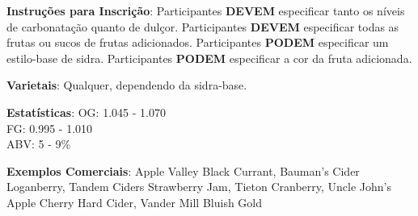\textbf{Instruções para Inscrição}: Participantes \textbf{DEVEM} especificar tanto os níveis de carbonatação quanto de dulçor. Participantes \textbf{DEVEM} especificar todas as frutas ou sucos de frutas adicionados. Participantes \textbf{PODEM} especificar um estilo-base de sidra. Participantes \textbf{PODEM} especificar a cor da fruta adicionada.

\textbf{Varietais}: Qualquer, dependendo da sidra-base.

\textbf{Estatísticas}: OG: 1.045 - 1.070 \\
\phantom{ } \hspace{16.5mm} FG: 0.995 - 1.010 \\
\phantom{ } \hspace{16.5mm} ABV: 5 - 9\%

\textbf{Exemplos Comerciais}: Apple Valley Black Currant, Bauman's Cider Loganberry, Tandem Ciders Strawberry Jam, Tieton Cranberry, Uncle John's Apple Cherry Hard Cider, Vander Mill Bluish Gold
